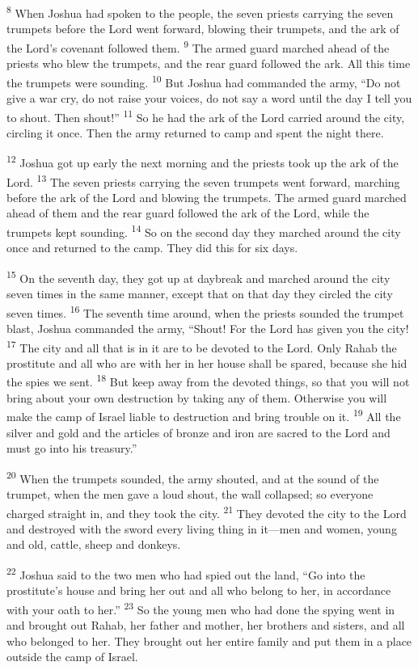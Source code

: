 \documentclass[12pt,twoside]{article}
\newcommand{\vs}[1]{\textsuperscript{#1}}
\begin{document}
\vs{8} When Joshua had spoken to the people, the seven priests carrying the seven trumpets before the Lord went forward, blowing their trumpets, and the ark of the Lord's covenant followed them.
\vs{9} The armed guard marched ahead of the priests who blew the trumpets, and the rear guard followed the ark. All this time the trumpets were sounding.
\vs{10} But Joshua had commanded the army, ``Do not give a war cry, do not raise your voices, do not say a word until the day I tell you to shout. Then shout!''
\vs{11} So he had the ark of the Lord carried around the city, circling it once. Then the army returned to camp and spent the night there.

\vs{12} Joshua got up early the next morning and the priests took up the ark of the Lord.
\vs{13} The seven priests carrying the seven trumpets went forward, marching before the ark of the Lord and blowing the trumpets. The armed guard marched ahead of them and the rear guard followed the ark of the Lord, while the trumpets kept sounding.
\vs{14} So on the second day they marched around the city once and returned to the camp. They did this for six days.

\vs{15} On the seventh day, they got up at daybreak and marched around the city seven times in the same manner, except that on that day they circled the city seven times.
\vs{16} The seventh time around, when the priests sounded the trumpet blast, Joshua commanded the army, ``Shout! For the Lord has given you the city!
\vs{17} The city and all that is in it are to be devoted to the Lord. Only Rahab the prostitute and all who are with her in her house shall be spared, because she hid the spies we sent.
\vs{18} But keep away from the devoted things, so that you will not bring about your own destruction by taking any of them. Otherwise you will make the camp of Israel liable to destruction and bring trouble on it.
\vs{19} All the silver and gold and the articles of bronze and iron are sacred to the Lord and must go into his treasury.''

\vs{20} When the trumpets sounded, the army shouted, and at the sound of the trumpet, when the men gave a loud shout, the wall collapsed; so everyone charged straight in, and they took the city.
\vs{21} They devoted the city to the Lord and destroyed with the sword every living thing in it---men and women, young and old, cattle, sheep and donkeys.

\vs{22} Joshua said to the two men who had spied out the land, ``Go into the prostitute's house and bring her out and all who belong to her, in accordance with your oath to her.''
\vs{23} So the young men who had done the spying went in and brought out Rahab, her father and mother, her brothers and sisters, and all who belonged to her. They brought out her entire family and put them in a place outside the camp of Israel.
\end{document}
